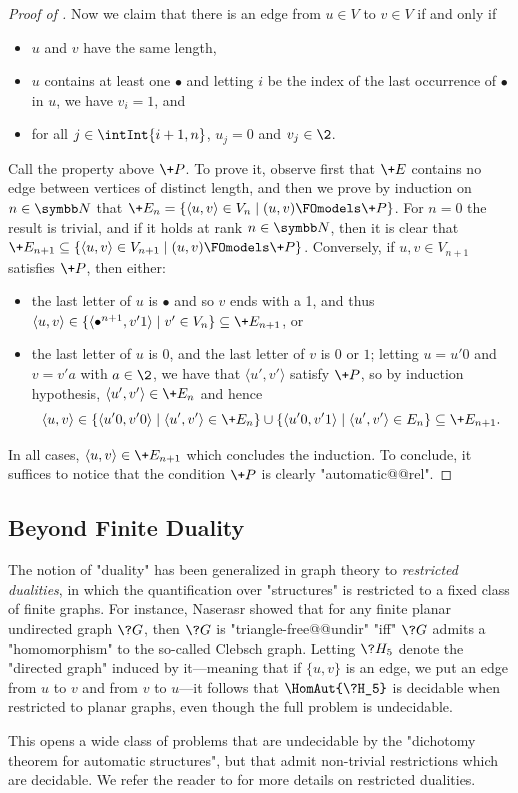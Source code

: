 \begin{proof}[Proof of ]
  Now we claim that there is an edge from $u \in V$ to $v \in V$ if and only if
  \begin{itemize}
    \item $u$ and $v$ have the same length,
    \item $u$ contains at least one $\bullet$
      and letting $i$ be the index of the last occurrence of $\bullet$ in $u$,
      we have $v_i = 1$, and
    \item for all $j \in \intInt{i+1,n}$, $u_j = 0$
    and $v_j \in \2$.
  \end{itemize}
  Call the property above $\+P$.
  To prove it, observe first that $\+E$ contains no edge
  between vertices of distinct length, and then we prove
  by induction on $n\in\N$ that $\+E_n = \{\langle u,v\rangle \in V_n \mid (u,v) \FOmodels \+P\}$.
  For $n=0$ the result is trivial, and if it holds at rank $n\in\N$,
  then it is clear that $\+E_{n+1} \subseteq
  \{\langle u,v\rangle \in V_{n+1} \mid (u,v) \FOmodels \+P\}$.
  Conversely, if $u,v \in V_{n+1}$ satisfies $\+P$, then
  either:
  \begin{itemize}
    \item the last letter of $u$ is $\bullet$ and so $v$ ends with a
    1, and thus $\langle u,v \rangle \in \{\langle \bullet^{n+1}, v'1\rangle \mid v'\in V_n\}
    \subseteq \+E_{n+1}$, or 
    \item the last letter of $u$ is $0$, and the last letter of $v$ is $0$ or $1$;
      letting $u = u'0$ and $v = v'a$ with $a \in \2$, we have
      that $\langle u', v'\rangle$ satisfy $\+P$, so by induction hypothesis,
      $\langle u', v'\rangle \in \+E_n$ and hence
      \[\langle u,v \rangle \in \{\langle u'0,v'0\rangle \mid \langle u',v'\rangle \in \+E_n\}
      \cup \{\langle u'0,v'1\rangle \mid \langle u',v'\rangle \in E_n\} \subseteq \+E_{n+1}.\]
  \end{itemize}
  In all cases, $\langle u,v\rangle \in \+E_{n+1}$ which concludes the induction.
  To conclude, it suffices to notice that the condition $\+P$ is clearly "automatic@@rel".
\end{proof}


\subsection{Beyond Finite Duality}

The notion of "duality" has been generalized in graph theory to \emph{restricted dualities},  
in which the quantification over "structures" is restricted to a fixed class of finite graphs.
For instance, Naserasr showed \cite[Theorem 11]{Naserasr2007PlanarDuality} that 
for any finite planar undirected graph $\?G$, then $\?G$ is "triangle-free@@undir"
"iff" $\?G$ admits a "homomorphism" to the so-called Clebsch graph.
Letting $\?H_5$ denote the "directed graph" induced by it---meaning that if $\{u,v\}$ is an edge,
we put an edge from $u$ to $v$ and from $v$ to $u$---it follows that
$\HomAut{\?H_5}$ is decidable when restricted to planar graphs,
even though the full problem is undecidable.

This opens a wide class of problems that are undecidable by the "dichotomy theorem for automatic structures", but that admit non-trivial restrictions which are decidable.
We refer the reader to \cite{NesetrilPOM2012RestrictedDualities} for more details on restricted dualities.